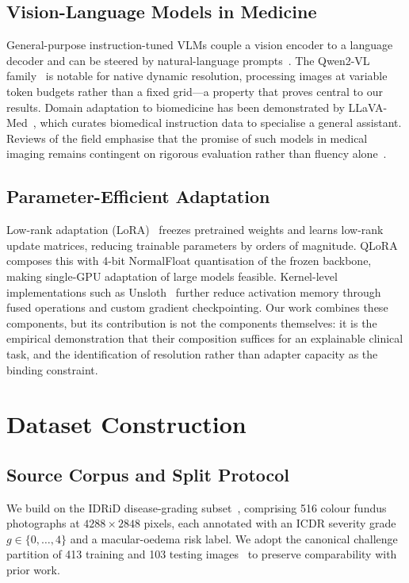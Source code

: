 \documentclass[conference]{IEEEtran}
\begin{document}
\subsection{Vision-Language Models in Medicine}
General-purpose instruction-tuned VLMs couple a vision encoder to a language
decoder and can be steered by natural-language prompts~\cite{liu2023llava}. The
Qwen2-VL family~\cite{wang2024qwen2vl} is notable for native dynamic resolution,
processing images at variable token budgets rather than a fixed grid---a property
that proves central to our results. Domain adaptation to biomedicine has been
demonstrated by LLaVA-Med~\cite{li2023llavamed}, which curates biomedical
instruction data to specialise a general assistant. Reviews of the field
emphasise that the promise of such models in medical imaging remains contingent
on rigorous evaluation rather than fluency alone~\cite{rajpurkar2022ai}.

\subsection{Parameter-Efficient Adaptation}
Low-rank adaptation (LoRA)~\cite{hu2022lora} freezes pretrained weights and
learns low-rank update matrices, reducing trainable parameters by orders of
magnitude. QLoRA~\cite{dettmers2023qlora} composes this with 4-bit NormalFloat
quantisation of the frozen backbone, making single-GPU adaptation of large models
feasible. Kernel-level implementations such as Unsloth~\cite{unsloth2024} further
reduce activation memory through fused operations and custom gradient
checkpointing. Our work combines these components, but its contribution is not
the components themselves: it is the empirical demonstration that their
composition suffices for an explainable clinical task, and the identification of
resolution rather than adapter capacity as the binding constraint.

\section{Dataset Construction}
\label{sec:dataset}

\subsection{Source Corpus and Split Protocol}
We build on the IDRiD disease-grading subset~\cite{porwal2018idrid}, comprising
516 colour fundus photographs at $4288\times2848$ pixels, each annotated with an
ICDR severity grade $g \in \{0,\dots,4\}$ and a macular-oedema risk label. We
adopt the canonical challenge partition of 413 training and 103 testing
images~\cite{porwal2020challenge} to preserve comparability with prior work.
\end{document}
